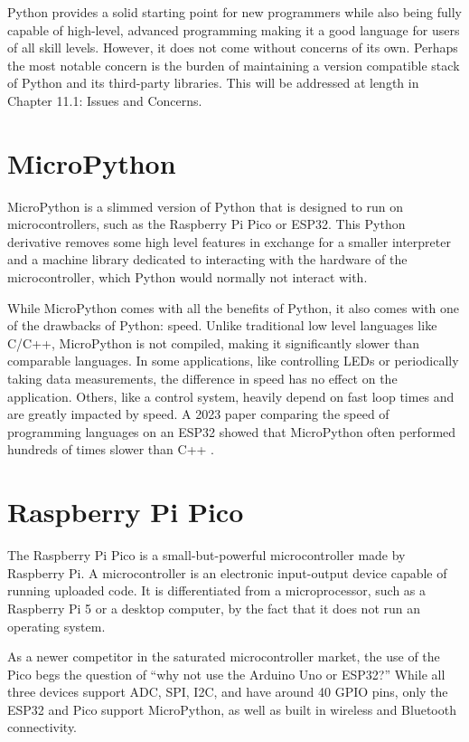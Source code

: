 Python provides a solid starting point for new programmers while also being fully capable of high-level,
advanced programming making it a good language for users of all skill levels. However, it does not come 
without concerns of its own. Perhaps the most notable concern is the burden of maintaining a version compatible
stack of Python and its third-party libraries. This will be addressed at length in Chapter 11.1: 
Issues and Concerns.

\section{MicroPython}

MicroPython is a slimmed version of Python that is designed to run on microcontrollers, such as the
Raspberry Pi Pico or ESP32. This Python derivative removes some high level features in exchange for
a smaller interpreter and a machine library dedicated to interacting with the hardware of the 
microcontroller, which Python would normally not interact with.

While MicroPython comes with all the benefits of Python, it also comes with one of the drawbacks
of Python: speed. Unlike traditional low level languages like C/C++, MicroPython is not compiled,
making it significantly slower than comparable languages. In some applications, like controlling LEDs
or periodically taking data measurements, the difference in
speed has no effect on the application. Others, like a control system, heavily depend on fast loop
times and are greatly impacted by speed. A 2023 paper comparing the speed of programming languages
on an ESP32 showed that MicroPython often performed hundreds of times slower than C++
\cite{language-speed}.

\section{Raspberry Pi Pico}

The Raspberry Pi Pico is a small-but-powerful microcontroller made by Raspberry Pi. A microcontroller
is an electronic input-output device capable of running uploaded code. It is differentiated
from a microprocessor, such as a Raspberry Pi 5 or a desktop computer, by the fact that it does not run 
an operating system. 

As a newer competitor in the saturated microcontroller market, the use of the Pico begs the question of 
``why not use the Arduino Uno or ESP32?'' While all three devices support ADC, SPI, I2C, and have 
around 40 GPIO pins, only the ESP32 and Pico support MicroPython, as well as built in wireless and 
Bluetooth connectivity.

